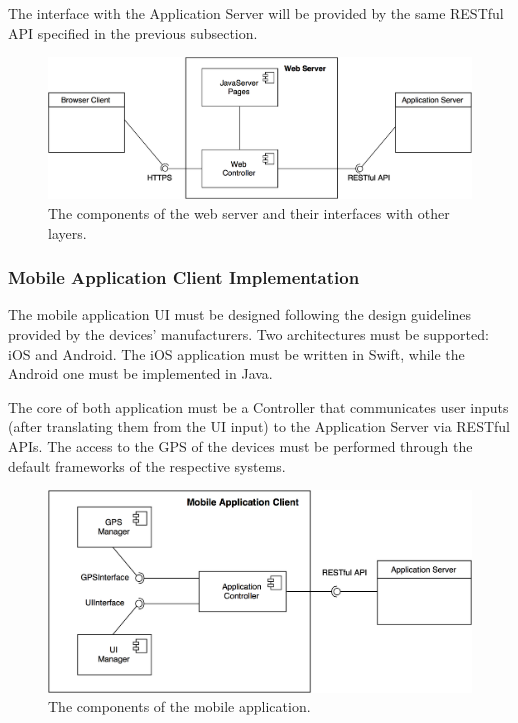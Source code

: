 The interface with the Application Server will be provided by the same RESTful API specified in the previous subsection.

\begin{figure}[H]
\begin{center}
		\includegraphics[width=\textwidth]{./arch_design/diagrams/web_server.png}
		\caption{The components of the web server and their interfaces with other layers.}
		\label{web_server}
\end{center}
\end{figure}

\subsubsection{Mobile Application Client Implementation}
The mobile application UI must be designed following the design guidelines provided by the devices' manufacturers. Two architectures must be supported: iOS and Android. The iOS application must be written in Swift, while the Android one must be implemented in Java.

The core of both application must be a Controller that communicates user inputs (after translating them from the UI input) to the Application Server via RESTful APIs. The access to the GPS of the devices must be performed through the default frameworks of the respective systems.

\begin{figure}[H]
\begin{center}
		\includegraphics[width=\textwidth]{./arch_design/diagrams/mobile_app_comps.png}
		\caption{The components of the mobile application.}
		\label{mobile_app_comps}
\end{center}
\end{figure}

